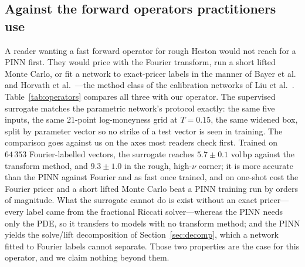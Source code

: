 \documentclass[preprint,12pt]{elsarticle}
\newcommand{\bp}{\ensuremath{\,\mathrm{bp}}}
\begin{document}
\subsection{Against the forward operators practitioners use}
\label{sec:operators}
A reader wanting a fast forward operator for rough Heston would not reach for a
PINN first. They would price with the Fourier transform, run a short lifted Monte
Carlo, or fit a network to exact-pricer labels in the manner of Bayer et
al.~\citep{bayer2019deep} and Horvath et al.~\citep{horvath2021deep}---the method
class of the calibration networks of Liu et al.~\citep{liu2019cann}.
Table~\ref{tab:operators} compares all three with our operator. The supervised
surrogate matches the parametric network's protocol exactly: the same five
inputs, the same 21-point log-moneyness grid at $T{=}0.15$, the same widened box,
split by parameter vector so no strike of a test vector is seen in training. The
comparison goes against us on the axes most readers check first. Trained on
$64\,353$ Fourier-labelled vectors, the surrogate reaches $5.7\pm0.1$ vol\bp{}
against the transform method, and $9.3\pm1.0$ in the rough, high-$\nu$ corner; it
is more accurate than the PINN against Fourier and as fast once trained, and on
one-shot cost the Fourier pricer and a short lifted Monte Carlo beat a PINN
training run by orders of magnitude. What the surrogate cannot do is exist
without an exact pricer---every label came from the fractional Riccati
solver---whereas the PINN needs only the PDE, so it transfers to models with no transform
method; and the PINN yields the solve/lift decomposition of
Section~\ref{sec:decomp}, which a network fitted to Fourier labels cannot
separate. Those two properties are the case for this operator, and we claim
nothing beyond them.
\end{document}

